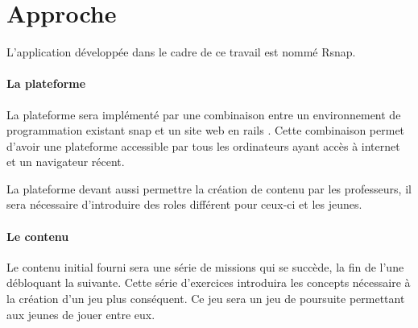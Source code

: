 \section{Approche}
\label{intro-approche}
L'application développée dans le cadre de ce travail est nommé \gls{Rsnap}.

\paragraph{La plateforme} La plateforme sera implémenté par une combinaison entre un environnement de programmation existant \gls{snap} \cite{snap} et un site web en \gls{rails} \cite{rails}. Cette combinaison permet d'avoir une plateforme accessible par tous les ordinateurs ayant accès à internet et un navigateur récent.

La plateforme devant aussi permettre la création de contenu par les professeurs, il sera nécessaire d'introduire des \glspl{role} différent pour ceux-ci et les jeunes.

\paragraph{Le contenu} Le contenu initial fourni sera une série de missions qui se succède, la fin de l'une débloquant la suivante. Cette série d'exercices introduira les concepts nécessaire à la création d'un jeu plus conséquent. Ce jeu sera un jeu de poursuite permettant aux jeunes de jouer entre eux.
